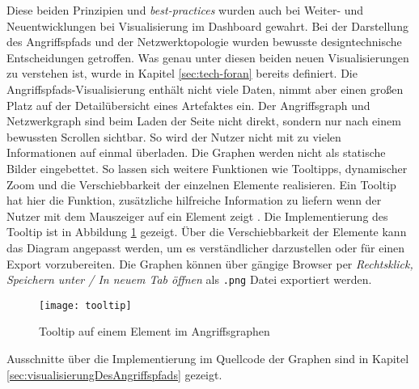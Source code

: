 \par Diese beiden Prinzipien und \textit{best-practices} wurden auch bei Weiter- und Neuentwicklungen bei Visualisierung im Dashboard gewahrt. Bei der Darstellung des Angriffspfads und der Netzwerktopologie wurden bewusste designtechnische Entscheidungen getroffen. Was genau unter diesen beiden neuen Visualisierungen zu verstehen ist, wurde in Kapitel \ref{sec:tech-foran}  bereits definiert. Die Angriffspfads-Visualisierung enthält nicht viele Daten, nimmt aber einen großen Platz auf der Detailübersicht eines Artefaktes ein. Der Angriffsgraph und Netzwerkgraph sind beim Laden der Seite nicht direkt, sondern nur nach einem bewussten Scrollen sichtbar. So wird der Nutzer nicht mit zu vielen Informationen auf einmal überladen. Die Graphen werden nicht als statische Bilder eingebettet. So lassen sich weitere Funktionen wie Tooltipps, dynamischer Zoom und die Verschiebbarkeit der einzelnen Elemente realisieren. Ein Tooltip hat hier die Funktion, zusätzliche hilfreiche Information zu liefern wenn der Nutzer mit dem Mauszeiger auf ein Element zeigt \autocite{TooltipCarbonDesign}. Die Implementierung des Tooltip ist in Abbildung \ref{fig:tooltip} gezeigt. Über die Verschiebbarkeit der Elemente kann das Diagram angepasst werden, um es verständlicher darzustellen oder für einen Export vorzubereiten. Die Graphen können über gängige Browser per \textit{Rechtsklick, Speichern unter / In neuem Tab öffnen} als \verb|.png| Datei exportiert werden.
%
\begin{figure}[H]
    \centering
    \texttt{[image: tooltip]}
    \caption{Tooltip auf einem Element im Angriffsgraphen}
    \label{fig:tooltip}
\end{figure}
%
\par Ausschnitte über die Implementierung im Quellcode der Graphen sind in Kapitel \ref{sec:visualisierungDesAngriffspfads} gezeigt.
